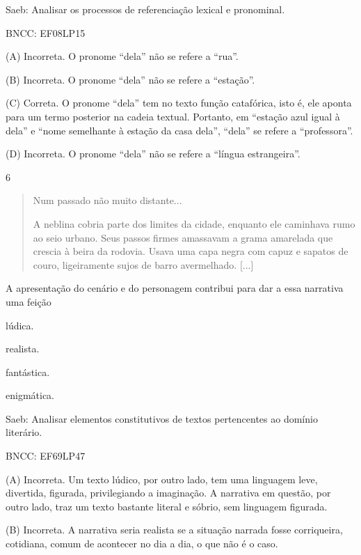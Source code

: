 Saeb: Analisar os processos de referenciação lexical e pronominal.

BNCC: EF08LP15

(A) Incorreta. O pronome ``dela'' não se refere a ``rua''.

(B) Incorreta. O pronome ``dela'' não se refere a ``estação''.

(C) Correta. O pronome ``dela'' tem no texto função catafórica, isto é,
ele aponta para um termo posterior na cadeia textual. Portanto, em
``estação azul igual à dela'' e ``nome semelhante à estação da casa
dela'', ``dela'' se refere a ``professora''.

(D) Incorreta. O pronome ``dela'' não se refere a ``língua
estrangeira''.

\num{6}

\begin{quote}
Num passado não muito distante...

A neblina cobria parte dos limites da cidade, enquanto ele caminhava
rumo ao seio urbano. Seus passos firmes amassavam a grama amarelada que
crescia à beira da rodovia. Usava uma capa negra com capuz e sapatos de
couro, ligeiramente sujos de barro avermelhado. {[}...{]}
\end{quote}


A apresentação do cenário e do personagem contribui para dar a essa
narrativa uma feição

\begin{escolha}
\item lúdica.

\item realista.

\item fantástica.

\item enigmática.
\end{escolha}

Saeb: Analisar elementos constitutivos de textos pertencentes ao domínio
literário.

BNCC: EF69LP47

(A) Incorreta. Um texto lúdico, por outro lado, tem uma linguagem leve,
divertida, figurada, privilegiando a imaginação. A narrativa em questão,
por outro lado, traz um texto bastante literal e sóbrio, sem linguagem
figurada.

(B) Incorreta. A narrativa seria realista se a situação narrada fosse
corriqueira, cotidiana, comum de acontecer no dia a dia, o que não é o
caso.

